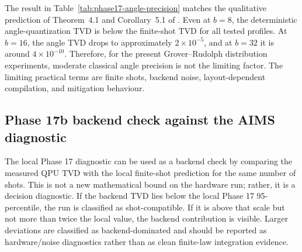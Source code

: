 The result in Table~\ref{tab:phase17-angle-precision} matches the qualitative
prediction of Theorem~4.1 and Corollary~5.1 of \cite{falco2026grproof}. Even
at \(b=8\), the deterministic angle-quantization TVD is below the finite-shot
TVD for all tested profiles.
At \(b=16\), the angle TVD drops to approximately \(2\times10^{-5}\), and at
\(b=32\) it is around \(4\times10^{-10}\). Therefore, for the present
Grover--Rudolph distribution experiments, moderate classical angle precision is
not the limiting factor. The limiting practical terms are finite shots,
backend noise, layout-dependent compilation, and mitigation behaviour.

\subsection{Phase 17b backend check against the AIMS diagnostic}
\label{subsec:phase17b-backend-check}

The local Phase 17 diagnostic can be used as a backend check by comparing the
measured QPU TVD with the local finite-shot prediction for the same number of
shots. This is not a new mathematical bound on the hardware run; rather, it is
a decision diagnostic. If the backend TVD lies below the local Phase 17
95-percentile, the run is classified as shot-compatible. If it is above that
scale but not more than twice the local value, the backend contribution is
visible. Larger deviations are classified as backend-dominated and should be
reported as hardware/noise diagnostics rather than as clean finite-law
integration evidence.

\begin{table}[h]
\centering
{}
\caption{Phase 17b comparison between existing QPU distribution measurements
and the local Phase 17 finite-shot TVD prediction at \(b=16\). The local
angle-quantization TVD is already negligible at this precision, so excess TVD
is attributed to backend, layout, compilation, and mitigation effects.}
\label{tab:phase17b-backend-check}
\end{table}

